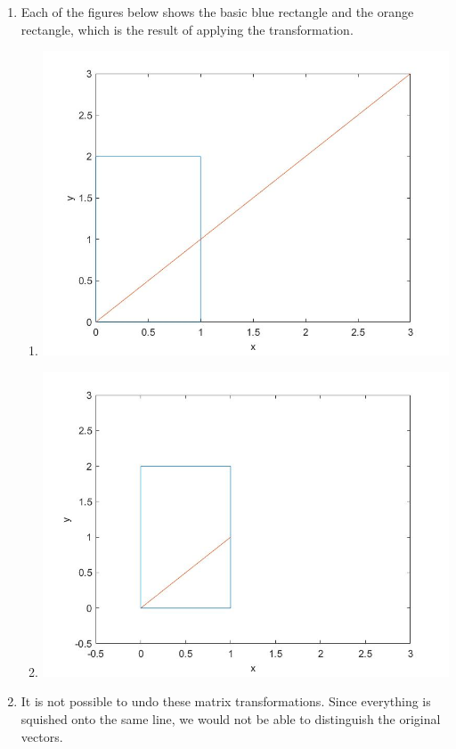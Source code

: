  \begin{sol}
 \begin{enumerate}
     \item 
 Each of the figures below shows the basic blue rectangle and the orange rectangle, which is the result of applying the transformation.
 \begin{enumerate}
     \item \begin{center}
         \includegraphics[width=.75\textwidth]{FacesDay2/figs/mat1.jpg}
     \end{center}
         \item \begin{center}
         \includegraphics[width=.75\textwidth]{FacesDay2/figs/mat2.jpg}
     \end{center}
 \end{enumerate}
 \item It is not possible to undo these matrix transformations. Since everything is squished onto the same line, we would not be able to distinguish the original vectors.
 \end{enumerate}
 

\end{sol}
